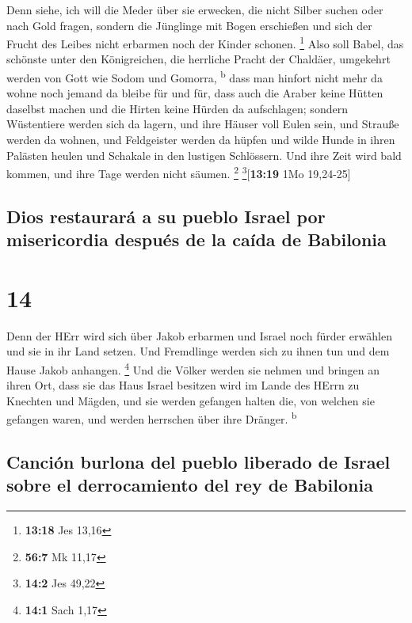  Denn siehe, ich will die Meder über sie erwecken, die
nicht Silber suchen oder nach Gold fragen,  sondern die
Jünglinge mit Bogen erschießen und sich der Frucht des Leibes nicht
erbarmen noch der Kinder schonen. \footnote{\textbf{13:18} Jes 13,16}
 Also soll Babel, das schönste unter den Königreichen,
die herrliche Pracht der Chaldäer, umgekehrt werden von Gott wie Sodom
und Gomorra, \textsuperscript{b}  dass man hinfort nicht
mehr da wohne noch jemand da bleibe für und für, dass auch die Araber
keine Hütten daselbst machen und die Hirten keine Hürden da aufschlagen;
 sondern Wüstentiere werden sich da lagern, und ihre
Häuser voll Eulen sein, und Strauße werden da wohnen, und Feldgeister
werden da hüpfen  und wilde Hunde in ihren Palästen
heulen und Schakale in den lustigen Schlössern. Und ihre Zeit wird bald
kommen, und ihre Tage werden nicht säumen. \footnote{\textbf{56:7} Mk
  11,17} \footnote{\textbf{14:2} Jes 49,22}{[}\textbf{13:19} 1Mo
19,24-25{]}

\hypertarget{dios-restauraruxe1-a-su-pueblo-israel-por-misericordia-despuuxe9s-de-la-cauxedda-de-babilonia}{%
\subsection{Dios restaurará a su pueblo Israel por misericordia después
de la caída de
Babilonia}\label{dios-restauraruxe1-a-su-pueblo-israel-por-misericordia-despuuxe9s-de-la-cauxedda-de-babilonia}}

\hypertarget{section-13}{%
\section{14}\label{section-13}}

 Denn der HErr wird sich über Jakob erbarmen und Israel
noch fürder erwählen und sie in ihr Land setzen. Und Fremdlinge werden
sich zu ihnen tun und dem Hause Jakob anhangen. \footnote{\textbf{14:1}
  Sach 1,17}  Und die Völker werden sie nehmen und bringen
an ihren Ort, dass sie das Haus Israel besitzen wird im Lande des HErrn
zu Knechten und Mägden, und sie werden gefangen halten die, von welchen
sie gefangen waren, und werden herrschen über ihre Dränger.
\textsuperscript{b}

\hypertarget{canciuxf3n-burlona-del-pueblo-liberado-de-israel-sobre-el-derrocamiento-del-rey-de-babilonia}{%
\subsection{Canción burlona del pueblo liberado de Israel sobre el
derrocamiento del rey de
Babilonia}\label{canciuxf3n-burlona-del-pueblo-liberado-de-israel-sobre-el-derrocamiento-del-rey-de-babilonia}}

